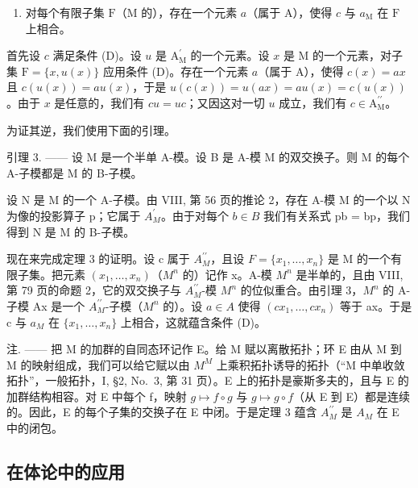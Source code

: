\begin{enumerate}
\def\labelenumi{(\Alph{enumi})}
\setcounter{enumi}{3}
\tightlist
\item
  对每个有限子集 \(\mathrm{F}\)（\(\mathrm{M}\) 的），存在一个元素 \(a\)（属于 \(\mathrm{A}\)），使得 \(c\) 与 \(a_{\mathrm{M}}\) 在 \(\mathrm{F}\) 上相合。
\end{enumerate}

首先设 \(c\) 满足条件 (D)。设 \(u\) 是 \(\mathrm{A}_{\mathrm{M}}^{\prime}\) 的一个元素。设 \(x\) 是 \(\mathrm{M}\) 的一个元素，对子集 \(\mathrm{F} = \{x, u(x)\}\) 应用条件 (D)。存在一个元素 \(a\)（属于 \(\mathrm{A}\)），使得 \(c(x) = ax\) 且 \(c(u(x)) = au(x)\)，于是 \(u(c(x)) = u(ax) = au(x) = c(u(x))\)。由于 \(x\) 是任意的，我们有 \(cu = uc\)；又因这对一切 \(u\) 成立，我们有 \(c \in \mathrm{A}_{\mathrm{M}}^{\prime \prime}\)。

为证其逆，我们使用下面的引理。

引理 3. —— 设 M 是一个半单 A-模。设 B 是 A-模 M 的双交换子。则 M 的每个 A-子模都是 M 的 B-子模。

设 N 是 M 的一个 A-子模。由 VIII, 第 56 页的推论 2，存在 A-模 M 的一个以 N 为像的投影算子 p；它属于 \(A_{M}^{\prime}\)。由于对每个 \(b \in B\) 我们有关系式 pb = bp，我们得到 N 是 M 的 B-子模。

现在来完成定理 3 的证明。设 c 属于 \(A_{M}^{\prime\prime}\)，且设 \(F = \{x_{1}, \ldots, x_{n}\}\) 是 M 的一个有限子集。把元素 \((x_{1}, \ldots, x_{n})\)（\(M^{n}\) 的）记作 x。A-模 \(M^{n}\) 是半单的，且由 VIII, 第 79 页的命题 2，它的双交换子与 \(A_{M}^{\prime\prime}\)-模 \(M^{n}\) 的位似重合。由引理 3，\(M^{n}\) 的 A-子模 Ax 是一个 \(A_{M}^{\prime\prime}\)-子模（\(M^{n}\) 的）。设 \(a \in A\) 使得 \((cx_{1}, \ldots, cx_{n})\) 等于 ax。于是 c 与 \(a_{M}\) 在 \(\{x_{1}, \ldots, x_{n}\}\) 上相合，这就蕴含条件 (D)。

注. —— 把 M 的加群的自同态环记作 E。给 M 赋以离散拓扑；环 E 由从 M 到 M 的映射组成，我们可以给它赋以由 \(M^{M}\) 上乘积拓扑诱导的拓扑（“M 中单收敛拓扑”，一般拓扑，I, §2, No.~3, 第 31 页）。E 上的拓扑是豪斯多夫的，且与 E 的加群结构相容。对 E 中每个 f，映射 \(g \mapsto f \circ g\) 与 \(g \mapsto g \circ f\)（从 E 到 E）都是连续的。因此，E 的每个子集的交换子在 E 中闭。于是定理 3 蕴含 \(A_{M}^{\prime\prime}\) 是 \(A_{M}\) 在 E 中的闭包。

\subsection{在体论中的应用}

